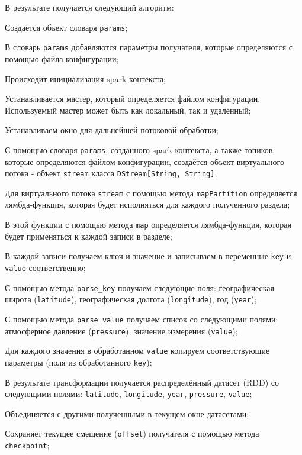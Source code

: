 В результате получается следующий алгоритм:
\begin{enumerate_step}
    \item Создаётся объект словаря \texttt{params};
    \item В словарь \texttt{params} добавляются параметры получателя, которые определяются с помощью файла конфигурации;
    \item Происходит инициализация spark-контекста;
    \item Устанавливается мастер, который определяется файлом конфигурации. 
    Используемый мастер может быть как локальный, так и удалённый;
    \item Устанавливаем окно для дальнейшей потоковой обработки;
    \item С помощью словаря \texttt{params}, созданного spark-контекста, а также топиков, которые определяются файлом конфигурации, создаётся объект виртуального потока - объект \texttt{stream} класса \texttt{DStream[String, String]};
    \item Для виртуального потока \texttt{stream} с помощью метода \texttt{mapPartition} определяется лямбда-функция, которая будет исполняться для каждого полученного раздела;
    \item В этой функции с помощью метода \texttt{map} определяется лямбда-функция, которая будет применяться к каждой записи в разделе;
    \item \label{i:gbt:map} В каждой записи получаем ключ и значение и записываем в переменные \texttt{key} и \texttt{value} соответственно;
    \item С помощью метода \texttt{parse\_key} получаем следующие поля: географическая широта (\texttt{latitude}), географическая долгота (\texttt{longitude}), год (\texttt{year});
    \item С помощью метода \texttt{parse\_value} получаем список со следующими полями: атмосферное давление (\texttt{pressure}), значение измерения (\texttt{value});
    \item Для каждого значения в обработанном \texttt{value} копируем соответствующие параметры (поля из обработанного \texttt{key});
    \item В результате трансформации получается распределённый датасет (RDD) со следующими полями: \texttt{latitude}, \texttt{longitude}, \texttt{year}, \texttt{pressure}, \texttt{value};
    \item Объединяется с другими полученными в текущем окне датасетами;
    \item Сохраняет текущее смещение (\texttt{offset}) получателя с помощью метода \texttt{checkpoint};

\end{enumerate_step}
